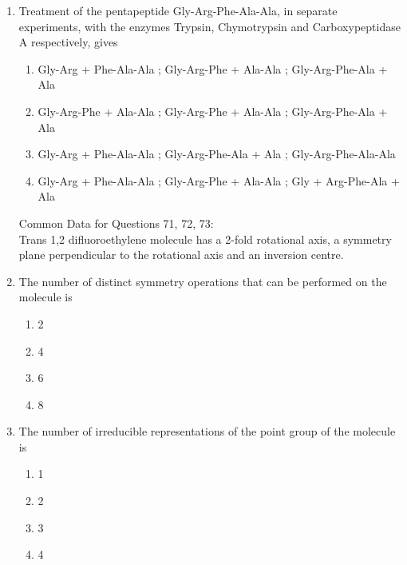 \documentclass[journal,12pt,onecolumn]{IEEEtran}
\theoremstyle{remark}
\begin{document}
\begin{enumerate}
\item  Treatment of the pentapeptide Gly-Arg-Phe-Ala-Ala, in separate experiments, with the enzymes Trypsin, Chymotrypsin and Carboxypeptidase A respectively, gives \hfill{}

\begin{multicols}{2}
\begin{enumerate}
\item Gly-Arg + Phe-Ala-Ala ; Gly-Arg-Phe + Ala-Ala ; Gly-Arg-Phe-Ala + Ala
\item Gly-Arg-Phe + Ala-Ala ; Gly-Arg-Phe + Ala-Ala ; Gly-Arg-Phe-Ala + Ala
\item Gly-Arg + Phe-Ala-Ala ; Gly-Arg-Phe-Ala + Ala ; Gly-Arg-Phe-Ala-Ala
\item Gly-Arg + Phe-Ala-Ala ; Gly-Arg-Phe + Ala-Ala ; Gly + Arg-Phe-Ala + Ala
\end{enumerate}
\end{multicols}


{Common Data for Questions 71, 72, 73:} \\
Trans 1,2 difluoroethylene molecule has a 2-fold rotational axis, a symmetry plane perpendicular to the rotational axis and an inversion centre.

\item  The number of distinct symmetry operations that can be performed on the molecule is \hfill{}

\begin{multicols}{2}
\begin{enumerate}
\item 2
\item 4
\item 6
\item 8
\end{enumerate}
\end{multicols}
 

\item  The number of irreducible representations of the point group of the molecule is \hfill{}

\begin{multicols}{2}
\begin{enumerate}
\item 1
\item 2
\item 3
\item 4
\end{enumerate}
\end{multicols}
 


\end{enumerate}
\end{document}
